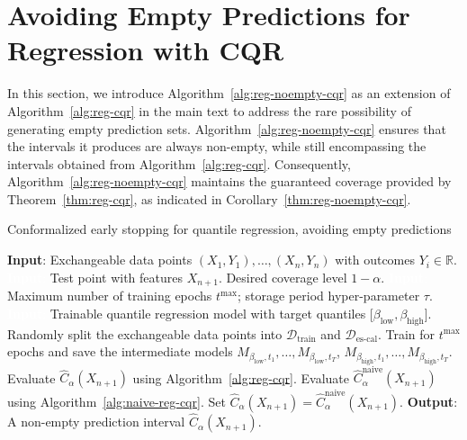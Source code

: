 \section{Avoiding Empty Predictions for Regression with CQR} \label{app:reg-noempty-quantile}

In this section, we introduce Algorithm~\ref{alg:reg-noempty-cqr} as an extension of Algorithm~\ref{alg:reg-cqr} in the main text to address the rare possibility of generating empty prediction sets. Algorithm~\ref{alg:reg-noempty-cqr} ensures that the intervals it produces are always non-empty, while still encompassing the intervals obtained from Algorithm~\ref{alg:reg-cqr}. Consequently, Algorithm~\ref{alg:reg-noempty-cqr} maintains the guaranteed coverage provided by Theorem~\ref{thm:reg-cqr}, as indicated in Corollary~\ref{thm:reg-noempty-cqr}.

\begin{algorithm}[H]
    \caption{Conformalized early stopping for quantile regression, avoiding empty predictions}
    \label{alg:reg-noempty-cqr}
    \begin{algorithmic}[1]
        \STATE \textbf{Input}: Exchangeable data points $(X_{1},Y_{1}), \ldots, (X_{n},Y_{n})$ with outcomes $Y_i \in \mathbb{R}$.
        \STATE \textcolor{white}{\textbf{Input}:} Test point with features $X_{n+1}$. Desired coverage level $1-\alpha$.
        \STATE \textcolor{white}{\textbf{Input}:} Maximum number of training epochs $t^{\text{max}}$; storage period hyper-parameter $\tau$.
        \STATE \textcolor{white}{\textbf{Input}:} Trainable quantile regression model with target quantiles [$\beta_{\text{low}}, \beta_{\text{high}}$].
        \STATE Randomly split the exchangeable data points into $\mathcal{D}_{\text{train}}$ and $\mathcal{D}_{\text{es-cal}}$.
        \STATE Train for $t^{\text{max}}$ epochs and save the intermediate models $M_{\beta_{\text{low}}, t_1} , \dots, M_{\beta_{\text{low}}, t_T}$, $M_{\beta_{\text{high}}, t_1} , \dots, M_{\beta_{\text{high}}, t_T}$.
        \STATE Evaluate $\hat{C}_{\alpha}(X_{n+1})$ using Algorithm~\ref{alg:reg-cqr}.
        \STATE Evaluate $\hat{C}^{\text{naive}}_{\alpha}(X_{n+1})$ using Algorithm~\ref{alg:naive-reg-cqr}. Set $\hat{C}_{\alpha}(X_{n+1}) = \hat{C}^{\text{naive}}_{\alpha}(X_{n+1})$.
        \ENDIF
        \STATE \textbf{Output}: A non-empty prediction interval $\hat{C}_{\alpha}(X_{n+1})$.
    \end{algorithmic}
\end{algorithm}

